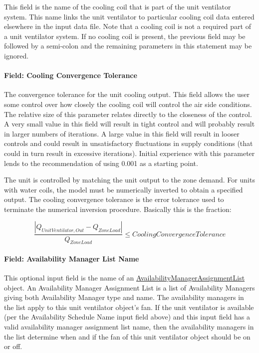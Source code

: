 This field is the name of the cooling coil that is part of the unit ventilator system. This name links the unit ventilator to particular cooling coil data entered elsewhere in the input data file. Note that a cooling coil is not a required part of a unit ventilator system. If no cooling coil is present, the previous field may be followed by a semi-colon and the remaining parameters in this statement may be ignored.

\paragraph{Field: Cooling Convergence Tolerance}\label{field-cooling-convergence-tolerance-1}

The convergence tolerance for the unit cooling output. This field allows the user some control over how closely the cooling coil will control the air side conditions. The relative size of this parameter relates directly to the closeness of the control. A very small value in this field will result in tight control and will probably result in larger numbers of iterations. A large value in this field will result in looser controls and could result in unsatisfactory fluctuations in supply conditions (that could in turn result in excessive iterations). Initial experience with this parameter lends to the recommendation of using 0.001 as a starting point.

The unit is controlled by matching the unit output to the zone demand. For units with water coils, the model must be numerically inverted to obtain a specified output. The cooling convergence tolerance is the error tolerance used to terminate the numerical inversion procedure. Basically this is the fraction:

\begin{equation}
\frac{{\left| {{Q_{UnitVentilator,Out}} - {Q_{ZoneLoad}}} \right|}}{{{Q_{ZoneLoad}}}} \le CoolingConvergenceTolerance
\end{equation}

\paragraph{Field: Availability Manager List Name}\label{field-availability-manager-list-name-1-000}

This optional input field is the name of an \hyperref[availabilitymanagerassignmentlist]{AvailabilityManagerAssignmentList} object. An Availability Manager Assignment List is a list of Availability Managers giving both Availability Manager type and name. The availability managers in the list apply to this unit ventilator object's fan. If the unit ventilator is available (per the Availability Schedule Name input field above) and this input field has a valid availability manager assignment list name, then the availability managers in the list determine when and if the fan of this unit ventilator object should be on or off.

